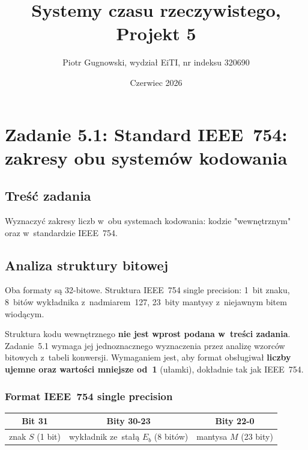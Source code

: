 \documentclass[12pt,a4paper]{article}
\title{Systemy czasu rzeczywistego, Projekt 5}
\author{Piotr Gugnowski, wydział EiTI, nr indeksu 320690}
\date{Czerwiec 2026}
\begin{document}
\maketitle

\section*{Zadanie 5.1: Standard IEEE~754: zakresy obu systemów kodowania}

\subsection*{Treść zadania}

Wyznaczyć zakresy liczb w~obu systemach kodowania: kodzie
"wewnętrznym" oraz w~standardzie IEEE~754.

\subsection*{Analiza struktury bitowej}

Oba formaty są 32-bitowe. Struktura IEEE~754 single precision:
1~bit znaku, 8~bitów wykładnika z~nadmiarem~127, 23~bity mantysy
z~niejawnym bitem wiodącym.

Struktura kodu wewnętrznego \textbf{nie jest wprost podana w~treści
zadania}. Zadanie~5.1 wymaga jej jednoznacznego wyznaczenia przez
analizę wzorców bitowych z~tabeli konwersji. Wymaganiem jest,
aby format obsługiwał \textbf{liczby ujemne oraz wartości mniejsze od~1}
(ułamki), dokładnie tak jak IEEE~754.

\subsubsection*{Format IEEE~754 single precision}

\begin{center}
\begin{tabular}{|c|c|c|}
\hline
\textbf{Bit 31} & \textbf{Bity 30-23} & \textbf{Bity 22-0} \\
\hline
znak $S$ (1 bit) & wykładnik ze~stałą $E_b$ (8 bitów) & mantysa $M$ (23 bity) \\
\hline
\end{tabular}
\end{center}
\end{document}
